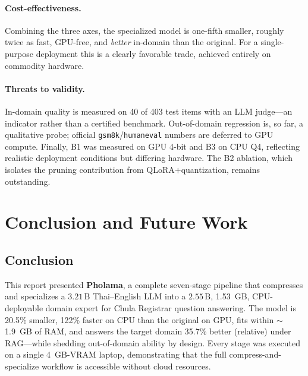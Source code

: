 \documentclass[11pt,a4paper]{article}
\newcommand{\param}[1]{\ensuremath{#1\,\text{B}}}
\begin{document}
\paragraph{Cost-effectiveness.} Combining the three axes, the specialized
model is one-fifth smaller, roughly twice as fast, GPU-free, and
\emph{better} in-domain than the original. For a single-purpose deployment
this is a clearly favorable trade, achieved entirely on commodity hardware.

\paragraph{Threats to validity.} In-domain quality is measured on 40 of 403
test items with an LLM judge---an indicator rather than a certified
benchmark. Out-of-domain regression is, so far, a qualitative probe; official
\texttt{gsm8k}/\texttt{humaneval} numbers are deferred to GPU compute.
Finally, B1 was measured on GPU 4-bit and B3 on CPU Q4, reflecting realistic
deployment conditions but differing hardware. The B2 ablation, which isolates
the pruning contribution from QLoRA$+$quantization, remains outstanding.

\section{Conclusion and Future Work}
\label{sec:conclusion}

\subsection{Conclusion}
This report presented \textbf{Pholama}, a complete seven-stage pipeline that
compresses and specializes a \param{3.21} Thai--English LLM into a
\param{2.55}, 1.53~GB, CPU-deployable domain expert for Chula Registrar
question answering. The model is 20.5\% smaller, 122\% faster on CPU than the
original on GPU, fits within $\sim$1.9~GB of RAM, and answers the target
domain 35.7\% better (relative) under RAG---while shedding out-of-domain
ability by design. Every stage was executed on a single \SI{4}{GB}-VRAM
laptop, demonstrating that the full compress-and-specialize workflow is
accessible without cloud resources.
\end{document}
